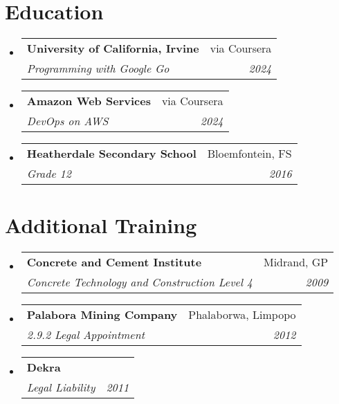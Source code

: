 \documentclass[letterpaper,11pt]{article}
\makeatletter
\newcommand{\resumeSubheading}[4]{
  \vspace{-2pt}\item
    \begin{tabular*}{0.97\textwidth}[t]{l@{\extracolsep{\fill}}r}
      \textbf{#1} & #2 \\
      \textit{\small#3} & \textit{\small #4} \\
    \end{tabular*}\vspace{-7pt}
}
\newcommand{\resumeSubHeadingListStart}{\begin{itemize}[leftmargin=0.15in, label={}]}
\newcommand{\resumeSubHeadingListEnd}{\end{itemize}}
\makeatother
\begin{document}
\section{Education}
  \resumeSubHeadingListStart
    \resumeSubheading
      {University of California, Irvine }{via Coursera}
      {Programming with Google Go}{2024}
    \resumeSubheading
      {Amazon Web Services}{via Coursera}
      {DevOps on AWS}{2024}
    \resumeSubheading
      {Heatherdale Secondary School}{Bloemfontein, FS}
      {Grade 12}{2016}
  \resumeSubHeadingListEnd
  \section{Additional Training}
  \resumeSubHeadingListStart
    \resumeSubheading
      {Concrete and Cement Institute}{Midrand, GP}
      {Concrete Technology and Construction Level 4}{2009}
    \resumeSubheading
      {Palabora Mining Company}{Phalaborwa, Limpopo}
      {2.9.2 Legal Appointment}{2012}
    \resumeSubheading
      {Dekra}{} 
      {Legal Liability}{2011}
  \resumeSubHeadingListEnd

\end{document}
